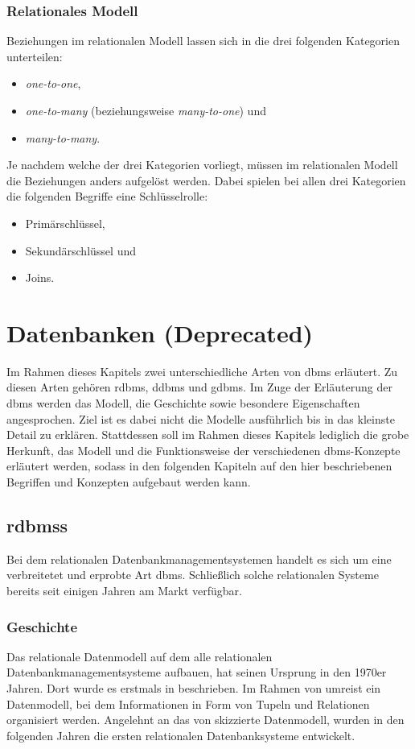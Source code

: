 \subsubsection{Relationales Modell}
Beziehungen im relationalen Modell lassen sich in die drei folgenden Kategorien unterteilen: 
\begin{itemize}
    \item \textit{one-to-one}, 
    \item \textit{one-to-many} (beziehungsweise \textit{many-to-one}) und 
    \item \textit{many-to-many}.
\end{itemize}
Je nachdem welche der drei Kategorien vorliegt, müssen im relationalen Modell die Beziehungen anders aufgelöst werden. Dabei spielen bei allen drei Kategorien die folgenden Begriffe eine Schlüsselrolle:
\begin{itemize}
    \item Primärschlüssel, 
    \item Sekundärschlüssel und
    \item Joins.
\end{itemize}

\section{Datenbanken (Deprecated)}
Im Rahmen dieses Kapitels zwei unterschiedliche Arten von \acl{dbms} erläutert. Zu diesen Arten gehören \acl{rdbms}, \acl{ddbms} und \acl{gdbms}. Im Zuge der Erläuterung der \acs{dbms} werden das Modell, die Geschichte sowie besondere Eigenschaften angesprochen. Ziel ist es dabei nicht die Modelle ausführlich bis in das kleinste Detail zu erklären. Stattdessen soll im Rahmen dieses Kapitels lediglich die grobe Herkunft, das Modell und die Funktionsweise der verschiedenen \acs{dbms}-Konzepte erläutert werden, sodass in den folgenden Kapiteln auf den hier beschriebenen Begriffen und Konzepten aufgebaut werden kann.   

\subsection{\acl{rdbms}s}
Bei dem relationalen Datenbankmanagementsystemen handelt es sich um eine verbreitetet und erprobte Art \acs{dbms}. Schließlich solche relationalen Systeme bereits seit einigen Jahren am Markt verfügbar. 

\subsubsection{Geschichte}
Das relationale Datenmodell auf dem alle relationalen Datenbankmanagementsysteme aufbauen, hat seinen Ursprung in den 1970er Jahren. Dort wurde es erstmals in \cite{codd_relational_model} beschrieben. Im Rahmen von \cite{codd_relational_model} umreist \citeauthor{codd_relational_model} ein Datenmodell, bei dem Informationen in Form von Tupeln und Relationen organisiert werden. Angelehnt an das von \citeauthor{codd_relational_model} skizzierte Datenmodell, wurden in den folgenden Jahren die ersten relationalen Datenbanksysteme entwickelt. 

